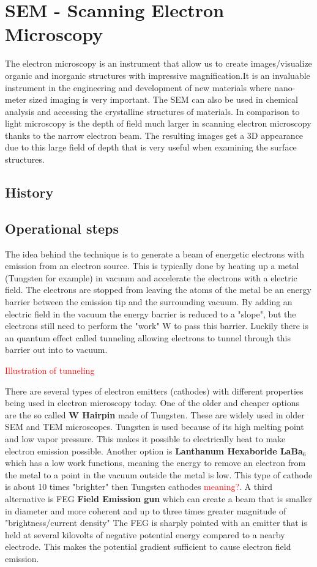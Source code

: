 \section{SEM - Scanning Electron Microscopy}
The electron microscopy is an instrument that allow us to create images/visualize organic and inorganic structures with impressive magnification.It is an invaluable instrument in the engineering and development of new materials where nano-meter sized imaging is very important. The SEM can also be used in chemical analysis and accessing the crystalline structures of materials. In comparison to light microscopy is the depth of field much larger in scanning electron microscopy thanks to the narrow electron beam. The resulting images get a 3D appearance due to this large field of depth that is very useful when examining the surface structures. 

\subsection*{History}

\subsection*{Operational steps}
The idea behind the technique is to generate a beam of energetic electrons with emission from an electron source. This is typically done by heating up a metal (Tungsten for example) in vacuum and accelerate the electrons with a electric field. The electrons are stopped from leaving the atoms of the metal be an energy barrier between the emission tip and the surrounding vacuum. By adding an electric field in the vacuum the energy barrier is reduced to a "slope", but the electrons still need to perform the "work" W to pass this barrier. Luckily there is an quantum effect called tunneling allowing electrons to tunnel through this barrier out into to vacuum.   

\textcolor{red}{Illustration of tunneling} 

There are several types of electron emitters (cathodes) with different properties being used in electron microscopy today. One of the older and cheaper options are the so called \textbf{W Hairpin} made of Tungsten. These are widely used in older SEM and TEM microscopes. Tungsten is used because of its high melting point and low vapor pressure. This makes it possible to electrically heat to make electron emission possible. Another option is \textbf{Lanthanum Hexaboride LaBa$_6$} which has a low work functions, meaning the energy to remove an electron from the metal to a point in the vacuum outside the metal is low. This type of cathode is about 10 times "brighter" then Tungsten cathodes \textcolor{red}{meaning?}. A third alternative is FEG \textbf{Field Emission gun} which can create a beam that is smaller in diameter and more coherent and up to three times greater magnitude of "brightness/current density" The FEG is sharply pointed with an emitter that is held at several kilovolts of negative potential energy compared to a nearby electrode. This makes the potential gradient sufficient to cause electron field emission.     



